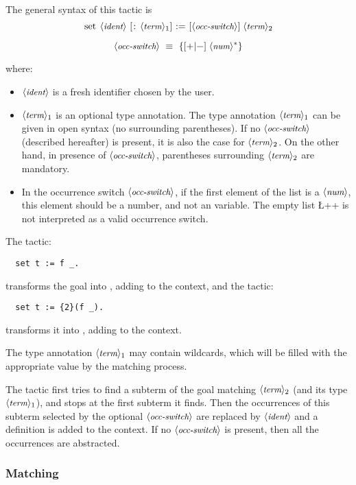 The general syntax of this tactic is
\[\C{set}\ \N{ident}\ [\C{:}\ \N{term}_1]\ \C{:=}\ [\N{occ-switch}]\;\N{term}_2\]

\[\N{occ-switch}\ \equiv\ \C{\{}[\C{+}|\C{-}]\;\N{num}^*\C{\}}\]


where:

\begin{itemize}
\item $\langle\mbox{\itshape\rmfamily\small ident}\rangle$ is a fresh identifier chosen by the user.
\item $\langle\mbox{\itshape\rmfamily\small term}\rangle_1$ is
an optional type annotation. The type annotation $\langle\mbox{\itshape\rmfamily\small term}\rangle_1$ can be
given in open syntax (no surrounding parentheses). If no $\langle\mbox{\itshape\rmfamily\small occ-switch}\rangle$
(described hereafter) is present, it is also
the case for $\langle\mbox{\itshape\rmfamily\small term}\rangle_2$.
On the other hand, in  presence of $\langle\mbox{\itshape\rmfamily\small occ-switch}\rangle$, parentheses
surrounding $\langle\mbox{\itshape\rmfamily\small term}\rangle_2$ are mandatory.
\item In the occurrence switch $\langle\mbox{\itshape\rmfamily\small occ-switch}\rangle$, if the first element
  of the list is a $\langle\mbox{\itshape\rmfamily\small num}\rangle$, this element should be a number, and not
  an \Ltac{} variable. The empty list \L+{}+ is not interpreted as a
  valid occurrence switch.
\end{itemize}

The tactic:
\begin{lstlisting}
  set t := f _.
\end{lstlisting}
transforms the goal  into , adding
 to the context, and the tactic:
\begin{lstlisting}
  set t := {2}(f _).
\end{lstlisting}
transforms it into , adding  to the context.

The type annotation $\langle\mbox{\itshape\rmfamily\small term}\rangle_1$ may
contain wildcards, which will be filled with the appropriate value by
the matching process.

The tactic first tries to find a subterm of the goal matching
$\langle\mbox{\itshape\rmfamily\small term}\rangle_2$ (and its type $\langle\mbox{\itshape\rmfamily\small term}\rangle_1$),
and stops at the first subterm it finds. Then the occurrences
of this subterm selected by the optional $\langle\mbox{\itshape\rmfamily\small occ-switch}\rangle$ are replaced
by $\langle\mbox{\itshape\rmfamily\small ident}\rangle$ and a definition  is added to
the context. If no $\langle\mbox{\itshape\rmfamily\small occ-switch}\rangle$ is present, then all the
occurrences are abstracted.

\subsubsection*{Matching}

